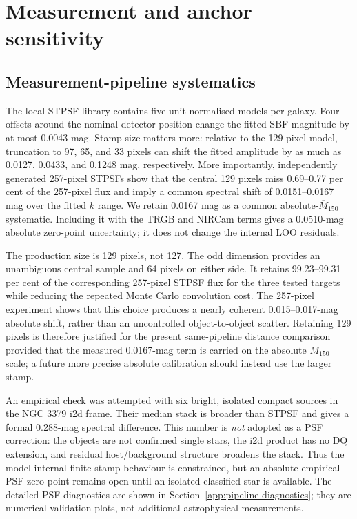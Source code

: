 \documentclass[nodoi,nocopyright]{pas}
\newcommand{\Mbar}{\overline{M}}
\begin{document}
\section{Measurement and anchor sensitivity}
\label{sec:notes-sensitivity}
\subsection{Measurement-pipeline systematics}

The local STPSF library contains five unit-normalised models per galaxy. Four
offsets around the nominal detector position change the fitted SBF magnitude
by at most 0.0043 mag. Stamp size matters more: relative to the
129-pixel model, truncation to 97, 65, and 33 pixels can shift the fitted
amplitude by as much as 0.0127, 0.0433, and 0.1248 mag, respectively. More
importantly, independently generated 257-pixel STPSFs show that the central
129 pixels miss 0.69--0.77 per cent of the 257-pixel flux and imply a common
spectral shift of 0.0151--0.0167 mag over the fitted $k$ range. We retain
0.0167 mag as a common absolute-$\Mbar_{150}$ systematic. Including it with
the TRGB and NIRCam terms gives a 0.0510-mag absolute zero-point uncertainty;
it does not change the internal LOO residuals.

The production size is 129 pixels, not 127. The odd dimension provides an
unambiguous central sample and 64 pixels on either side. It retains
99.23--99.31 per cent of the corresponding 257-pixel STPSF flux for the three
tested targets while reducing the repeated Monte Carlo convolution cost. The
257-pixel experiment shows that this choice produces a nearly coherent
0.015--0.017-mag absolute shift, rather than an uncontrolled object-to-object
scatter. Retaining 129 pixels is therefore justified for the present
same-pipeline distance comparison provided that the measured 0.0167-mag term
is carried on the absolute $\Mbar_{150}$ scale; a future more precise absolute
calibration should instead use the larger stamp.

An empirical check was attempted with six bright, isolated compact sources in
the NGC 3379 i2d frame. Their median stack is broader than STPSF and gives a
formal 0.288-mag spectral difference. This number is \emph{not} adopted as a
PSF correction: the objects are not confirmed single stars, the i2d product
has no DQ extension, and residual host/background structure broadens the
stack. Thus the model-internal finite-stamp behaviour is constrained, but an absolute
empirical PSF zero point remains open until an isolated classified star is
available. The detailed PSF diagnostics are shown in
Section~\ref{app:pipeline-diagnostics}; they are numerical validation plots,
not additional astrophysical measurements.
\end{document}
